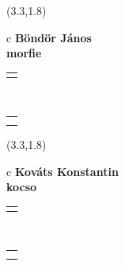 \documentclass[11pt]{article}
\begin{document}
\makebox(3.3,1.8){
  \renewcommand\arraystretch{1.3}
  \begin{tabular}[c]{c}
    \hspace{8.5mm}
    \LARGE\bf{ Böndör János }\\
    \hspace{8.5mm}
    \Large{ morfie }\\
    \renewcommand\arraystretch{3}
    \begin{tabular}[c]{c}
      \centering
      \fontfamily{phv}\selectfont{
        \textbf{
          \textsc{
            \scriptsize{
            \color{Bright}{ Ismerkedő }\color{Dark}{ Webmester }\color{Dark}{ Sminkmester }\color{Dark}{ Programozó }
            }
          }
        }
      }
    \end{tabular}
    \\
    \renewcommand\arraystretch{1}
    \begin{tabular}{p{3.3in}}
      \hspace{.7cm}\\
      \hspace{.7cm}\emph{  }\\
    \end{tabular}
  \end{tabular}
}

\makebox(3.3,1.8){
  \renewcommand\arraystretch{1.3}
  \begin{tabular}[c]{c}
    \hspace{8.5mm}
    \LARGE\bf{ Kováts Konstantin }\\
    \hspace{8.5mm}
    \Large{ kocso }\\
    \renewcommand\arraystretch{3}
    \begin{tabular}[c]{c}
      \centering
      \fontfamily{phv}\selectfont{
        \textbf{
          \textsc{
            \scriptsize{
            \color{Bright}{ Ismerkedő }\color{Dark}{ Webmester }\color{Bright}{ Sminkmester }\color{Bright}{ Programozó }
            }
          }
        }
      }
    \end{tabular}
    \\
    \renewcommand\arraystretch{1}
    \begin{tabular}{p{3.3in}}
      \hspace{.7cm}\\
      \hspace{.7cm}\emph{  }\\
    \end{tabular}
  \end{tabular}
}
\end{document}
